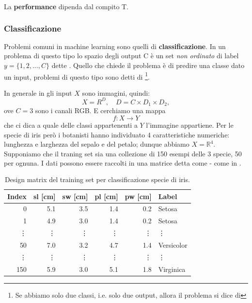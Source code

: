 \documentclass[10pt]{article}
\begin{document}
La \textbf{performance} dipenda dal compito T.

\subsubsection{Classificazione}
Problemi comuni in machine learning sono quelli di \textbf{classificazione}. In
un problema di questo tipo lo spazio degli output C è un set \textit{non
ordinato} di label \( y = \{ 1, 2, \ldots, C \} \) dette . Quello che
chiede il problema è di predire una classe dato un input, problemi di questo
tipo sono detti di \footnote{Se abbiamo solo due classi,
i.e. solo due output, allora il problema si dice di }.

\begin{example}\label{ex:iris}
In generale in  gli input \( X \) sono immagini, quindi:
\begin{equation}
X = R^D,\quad D = C \times D_1 \times D_2,
\end{equation}
ove \( C = 3 \) sono i canali RGB. E cerchiamo una mappa
\begin{equation}
f: X \longrightarrow Y
\end{equation}
che ci dica a quale delle classi appartenenti a \( Y \) l'immagine appartiene. Per
le specie di iris però i botanisti hanno individuato 4 caratteristiche
numeriche: lunghezza e larghezza del sepalo e del petalo; dunque abbiamo \( X =
\mathbb{R}^4 \). Supponiamo che il traning set sia una collezione di 150 esempi
delle 3 specie, 50 per ognuna. I dati possono essere raccolti in una matrice
detta  come  - come in .

\begin{table}
\centering
\begin{tabular}{rrrrrl}
\toprule
Index & sl [cm] & sw [cm] & pl [cm] & pw [cm] & Label \\
\midrule
0 & 5.1 & 3.5 & 1.4 & 0.2 & Setosa \\
1 & 4.9 & 3.0 & 1.4 & 0.2 & Setosa \\
\vdots & \vdots & \vdots & \vdots & \vdots & \vdots \\
50 & 7.0 & 3.2 & 4.7 & 1.4 & Versicolor \\
\vdots & \vdots & \vdots & \vdots & \vdots & \vdots \\
150 & 5.9 & 3.0 & 5.1 & 1.8 & Virginica \\
\bottomrule
\end{tabular}
\caption{Design matrix del training set per classificazione specie di iris.}\label{tab:iris}
\end{table}


\end{example}
\end{document}
